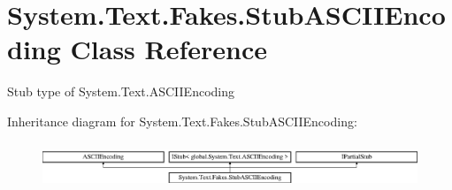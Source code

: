\hypertarget{class_system_1_1_text_1_1_fakes_1_1_stub_a_s_c_i_i_encoding}{\section{System.\-Text.\-Fakes.\-Stub\-A\-S\-C\-I\-I\-Encoding Class Reference}
\label{class_system_1_1_text_1_1_fakes_1_1_stub_a_s_c_i_i_encoding}
}


Stub type of System.\-Text.\-A\-S\-C\-I\-I\-Encoding 


Inheritance diagram for System.\-Text.\-Fakes.\-Stub\-A\-S\-C\-I\-I\-Encoding\-:\begin{figure}[H]
\begin{center}
\leavevmode
\includegraphics[height=1.403509cm]{class_system_1_1_text_1_1_fakes_1_1_stub_a_s_c_i_i_encoding}
\end{center}
\end{figure}
